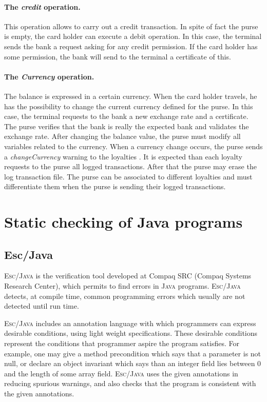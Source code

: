 \documentclass[a4paper]{llncs}
\begin{document}
\paragraph{\bf The \textit{credit} operation.} This operation allows
to carry out a credit transaction. In spite of fact the purse is
empty, the
card holder can execute a debit operation. In this case, the terminal
sends the bank a request asking for any credit permission. If the card 
holder has some permission, the bank will send to the terminal a
certificate of this.


\paragraph{\bf The \textit{Currency} operation.} The balance is
expressed in a certain currency. When the card holder travels, he has
the possibility to
change the current currency defined for the purse. In this case, the
terminal requests to the bank a
new exchange rate and a certificate. The purse verifies that the bank is 
really the expected bank and validates the exchange rate. After
changing the balance value, the purse must modify all variables related
to the currency.
When a currency change occurs, the purse sends a
\textit{changeCurrency} warning to the loyalties . It is expected than
each loyalty
requests to the purse all logged transactions. After that the purse
may erase
the log transaction file. The purse can be associated to different
loyalties and must differentiate them when the purse is sending
their logged transactions. 






\section{Static checking of Java programs}
\label{SectStatic}


\subsection{\sc \bf Esc/Java}
\label{SubSectEscJava}
\textsc{Esc/Java} is the verification tool developed at
Compaq SRC (Compaq Systems Research Center), which permits to find
 errors in \textsc{Java} programs. \textsc{Esc/Java} detects, at
compile time, common programming errors which usually are not
detected until run time. 

\textsc{Esc/Java} includes an annotation language with which
programmers can express desirable conditions, using light weight
specifications. These desirable conditions represent the conditions
that programmer aspire the program satisfies. For example, one may
give a method precondition which
says that a parameter is not null, or declare an object invariant which
says than an integer field lies between $0$ and the length of some
array field. \textsc{Esc/Java} uses the given annotations in reducing
spurious warnings, and also checks that the program is consistent with 
the given annotations. 
\end{document}
